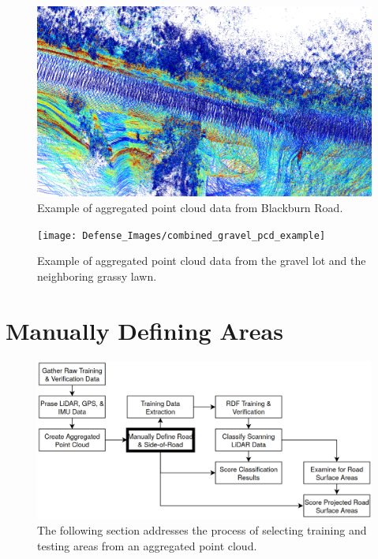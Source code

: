 \documentclass[numbered,pdftex]{ohio-etd}
\begin{document}
{{		\begin{figure}[H]
			\centering
			\includegraphics[width=0.95\linewidth]{Defense_Images/combined_pcd_example}
			\caption[Example Aggregated Point Cloud]{Example of aggregated point cloud data from Blackburn Road.}
			\label{fig:combined_pcd_example}
		\end{figure}
		
		\begin{figure}[H]
			\centering
			\texttt{[image: Defense\_Images/combined\_gravel\_pcd\_example]}
			\caption[Example Aggregated Point Cloud]{Example of aggregated point cloud data from the gravel lot and the neighboring grassy lawn.}
			\label{fig:combined_gravel_pcd_example}
		\end{figure}	
			
	} %
	
	\section{Manually Defining Areas}\label{sec:manually_defining_areas}{
		
		\begin{figure}[H]
			\centering
			\includegraphics[width=0.9\linewidth]{Defense_Images/flowz_define_areas}
			\caption[Manually Defined Areas Flowchart Context]{The following section addresses the process of selecting training and testing areas from an aggregated point cloud.}
			\label{fig:flowz_define_areas}
		\end{figure}
		
}}
\end{document}
